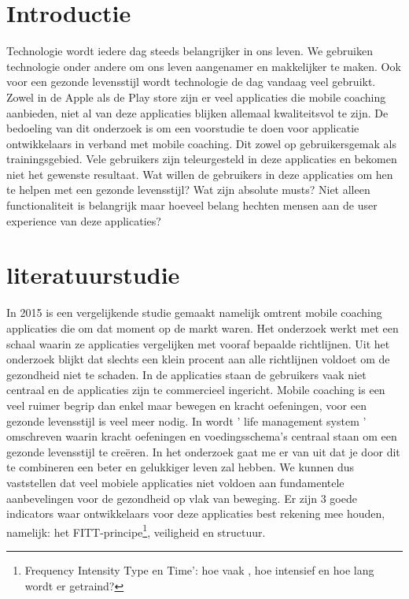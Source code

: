 
\section{Introductie} %
\label{sec:introductie}
Technologie wordt iedere dag steeds belangrijker in ons leven. We gebruiken technologie onder andere om ons leven aangenamer en makkelijker te maken. Ook voor een gezonde levensstijl wordt technologie de dag vandaag veel gebruikt. Zowel in de Apple als de Play store zijn er veel applicaties die mobile coaching aanbieden, niet al van deze applicaties blijken allemaal kwaliteitsvol te zijn. \hfill \break \break
De bedoeling van dit onderzoek is om een voorstudie te doen voor applicatie ontwikkelaars in verband met mobile coaching. Dit zowel op gebruikersgemak als trainingsgebied. Vele gebruikers zijn teleurgesteld in deze applicaties en bekomen niet het gewenste resultaat. Wat willen de gebruikers in deze applicaties om hen te helpen met een gezonde levensstijl? Wat zijn absolute musts? Niet alleen functionaliteit is belangrijk maar hoeveel belang hechten mensen aan de user experience van deze applicaties?



\section{literatuurstudie }
\label{sec:state-of-the-art}
In 2015 is een vergelijkende studie gemaakt namelijk \textcite{JMIR2015}  omtrent mobile coaching applicaties die om dat moment op de markt waren. Het onderzoek werkt met een schaal waarin ze applicaties vergelijken met vooraf bepaalde richtlijnen. Uit het onderzoek blijkt dat slechts een klein procent aan alle richtlijnen voldoet om de gezondheid niet te schaden. In de applicaties staan de gebruikers vaak niet centraal en de applicaties zijn te commercieel ingericht. \break
\break
Mobile coaching is een veel ruimer begrip dan enkel maar bewegen en kracht oefeningen, voor een gezonde levensstijl is veel meer nodig. In \textcite{EQUILIBRIO2005}  wordt ' life management system ' omschreven waarin kracht oefeningen en voedingsschema's centraal staan om een gezonde levensstijl te creëren. In het onderzoek gaat me er van uit dat je door dit te combineren een beter en gelukkiger leven zal hebben. \break
 \break
We kunnen dus vaststellen dat veel mobiele applicaties niet voldoen aan fundamentele aanbevelingen voor de gezondheid op vlak van beweging. Er zijn 3 goede indicators waar ontwikkelaars voor deze applicaties best rekening mee houden, namelijk: het FITT-principe\footnote{Frequency Intensity Type en Time’: hoe vaak , hoe intensief en hoe lang wordt er getraind?
}, veiligheid en structuur.

